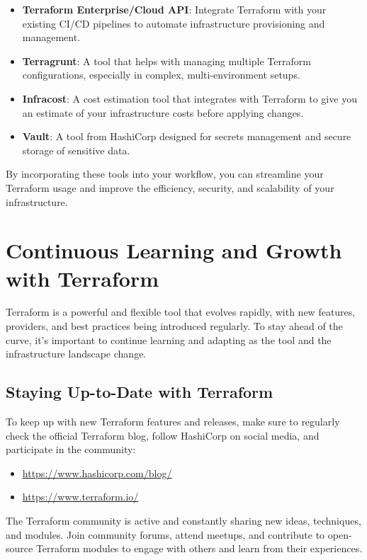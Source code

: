 \begin{itemize}
  \item \textbf{Terraform Enterprise/Cloud API}: Integrate Terraform with your existing CI/CD pipelines to automate infrastructure provisioning and management.
  \item \textbf{Terragrunt}: A tool that helps with managing multiple Terraform configurations, especially in complex, multi-environment setups.
  \item \textbf{Infracost}: A cost estimation tool that integrates with Terraform to give you an estimate of your infrastructure costs before applying changes.
  \item \textbf{Vault}: A tool from HashiCorp designed for secrets management and secure storage of sensitive data.
\end{itemize}

By incorporating these tools into your workflow, you can streamline your Terraform usage and improve the efficiency, security, and scalability of your infrastructure.

\section{Continuous Learning and Growth with Terraform}

Terraform is a powerful and flexible tool that evolves rapidly, with new features, providers, and best practices being introduced regularly. To stay ahead of the curve, it's important to continue learning and adapting as the tool and the infrastructure landscape change.

\subsection{Staying Up-to-Date with Terraform}

To keep up with new Terraform features and releases, make sure to regularly check the official Terraform blog, follow HashiCorp on social media, and participate in the community:

\begin{itemize}
  \item \url{https://www.hashicorp.com/blog/}
  \item \url{https://www.terraform.io/}
\end{itemize}

The Terraform community is active and constantly sharing new ideas, techniques, and modules. Join community forums, attend meetups, and contribute to open-source Terraform modules to engage with others and learn from their experiences.

